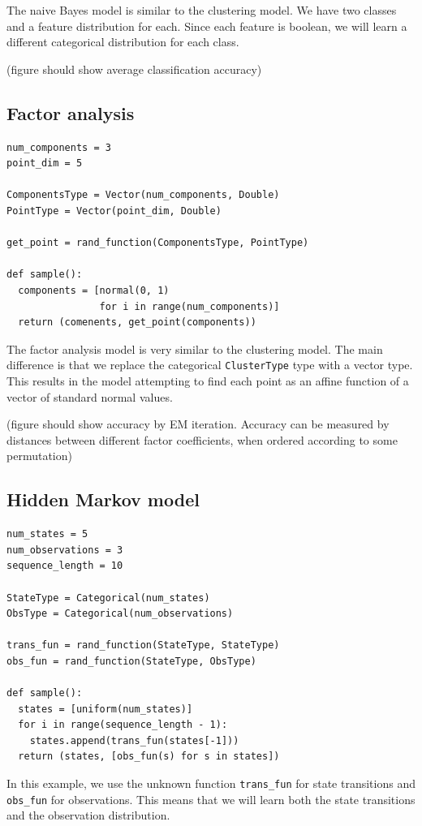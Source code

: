 \documentclass{article}
\begin{document}
The naive Bayes model is similar to the clustering model.  We have two classes and a feature
distribution for each.  Since each feature is boolean, we will learn
a different categorical distribution for each class.

(figure should show average classification accuracy)

  \subsection{Factor analysis}
{\small
\begin{verbatim}
num_components = 3
point_dim = 5

ComponentsType = Vector(num_components, Double)
PointType = Vector(point_dim, Double)

get_point = rand_function(ComponentsType, PointType)

def sample():
  components = [normal(0, 1)
                for i in range(num_components)]
  return (comenents, get_point(components))
\end{verbatim}
}

The factor analysis model is very similar to the clustering model.  The main difference is that we replace the categorical \texttt{ClusterType} type with a vector type.  This results in the model attempting to find each point as an affine function of a vector of standard normal values.

(figure should show accuracy by EM iteration.  Accuracy can be measured by distances between different factor coefficients, when ordered according to some permutation)
  \subsection{Hidden Markov model}
{\small
\begin{verbatim}
num_states = 5
num_observations = 3
sequence_length = 10

StateType = Categorical(num_states)
ObsType = Categorical(num_observations)

trans_fun = rand_function(StateType, StateType)
obs_fun = rand_function(StateType, ObsType)

def sample():
  states = [uniform(num_states)]
  for i in range(sequence_length - 1):
    states.append(trans_fun(states[-1]))
  return (states, [obs_fun(s) for s in states])
\end{verbatim}
}

In this example, we use the unknown function \texttt{trans\_fun} for state transitions and \texttt{obs\_fun} for observations.  This means that we will learn both the state transitions and the observation distribution.
\end{document}
